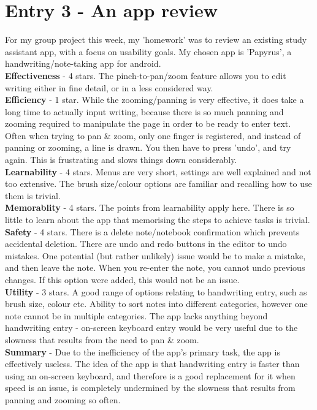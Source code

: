 \documentclass{article}
\begin{document}
\section*{Entry 3 - An app review}

\noindent For my group project this week, my 'homework' was to review an existing study assistant app, with a focus on usability goals. My chosen app is 'Papyrus', a handwriting/note-taking app for android.
\\\indent \textbf{Effectiveness} - 4 stars. The pinch-to-pan/zoom feature allows you to edit writing either in fine detail, or in a less considered way.
\\\indent \textbf{Efficiency} - 1 star. While the zooming/panning is very effective, it does take a long time to actually input writing, because there is so much panning and zooming required to manipulate the page in order to be ready to enter text. Often when trying to pan \& zoom, only one finger is registered, and instead of panning or zooming, a line is drawn. You then have to press 'undo', and try again. This is frustrating and slows things down considerably.
\\\indent \textbf{Learnability} - 4 stars. Menus are very short, settings are well explained and not too extensive. The brush size/colour options are familiar and recalling how to use them is trivial.
\\\indent \textbf{Memorablity} - 4 stars. The points from learnability apply here. There is so little to learn about the app that memorising the steps to achieve tasks is trivial.
\\\indent \textbf{Safety} - 4 stars. There is a delete note/notebook confirmation which prevents accidental deletion. There are undo and redo buttons in the editor to undo mistakes. One potential (but rather unlikely) issue would be to make a mistake, and then leave the note. When you re-enter the note, you cannot undo previous changes. If this option were added, this would not be an issue.
\\\indent \textbf{Utility} - 3 stars. A good range of options relating to handwriting entry, such as brush size, colour etc. Ability to sort notes into different categories, however one note cannot be in multiple categories. The app lacks anything beyond handwriting entry - on-screen keyboard entry would be very useful due to the slowness that results from the need to pan \& zoom.
\\\indent \textbf{Summary} - Due to the inefficiency of the app's primary task, the app is effectively useless. The idea of the app is that handwriting entry is faster than using an on-screen keyboard, and therefore is a good replacement for it when speed is an issue, is completely undermined by the slowness that results from panning and zooming so often.
\end{document}
